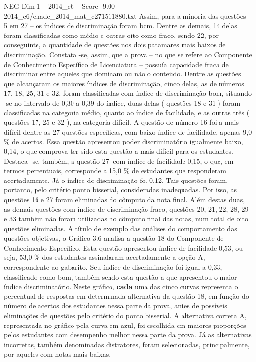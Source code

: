 \begin{textsample}{NEG Dim 1 – 2014\_c6 – Score -9.00 – 2014\_c6/enade\_2014\_mat\_c271511880.txt}
Assim, para a minoria das questões – 5 em 27 – os índices de discriminação foram bom.
Dentre as demais, 14 delas foram classificadas como médio e outras oito como fraco, sendo 22, por conseguinte, a quantidade de questões nos dois patamares mais baixos de discriminação.
Constata -se, assim, que a prova – no que se refere ao Componente de Conhecimento Específico de Licenciatura – possuía capacidade fraca de discriminar entre aqueles que dominam ou não o conteúdo.
Dentre as questões que alcançaram os maiores índices de discriminação, cinco delas, as de números 17, 18, 25, 31 e 32, foram classificadas com índice de discriminação bom, situando -se no intervalo de 0,30 a 0,39 do índice, duas delas ( questões 18 e 31 ) foram classificadas na categoria médio, quanto ao índice de facilidade, e as outras três ( questões 17, 25 e 32 ), na categoria difícil.
A questão de número 16 foi a mais difícil dentre as 27 questões específicas, com baixo índice de facilidade, apenas 9,0 \% de acertos.
Essa questão apresentou poder discriminatório igualmente baixo, 0,14, o que comprova ter sido esta questão a mais difícil para os estudantes.
Destaca -se, também, a questão 27, com índice de facilidade 0,15, o que, em termos percentuais, corresponde a 15,0 \% de estudantes que responderam acertadamente.
Já o índice de discriminação foi 0,12.
Tais questões foram, portanto, pelo critério ponto bisserial, consideradas inadequadas.
Por isso, as questões 16 e 27 foram eliminadas do cômputo da nota final.
Além destas duas, as demais questões com índice de discriminação fraco, questões 20, 21, 22, 28, 29 e 33 também não foram utilizadas no cômputo final das notas, num total de oito questões eliminadas.
A título de exemplo das análises do comportamento das questões objetivas, o Gráfico 3.6 analisa a questão 18 do Componente de Conhecimento Específico.
Esta questão apresentou índice de facilidade 0,53, ou seja, 53,0 \% dos estudantes assinalaram acertadamente a opção A, correspondente ao gabarito.
Seu índice de discriminação foi igual a 0,33, classificado como bom, também sendo esta questão a que apresentou o maior índice discriminatório.
Neste gráfico, \textbf{cada} uma das cinco curvas representa o percentual de respostas em determinada alternativa da questão 18, em função do número de acertos dos estudantes nessa parte da prova, antes de possíveis eliminações de questões pelo critério do ponto bisserial.
A alternativa correta A, representada no gráfico pela curva em azul, foi escolhida em maiores proporções pelos estudantes com desempenho melhor nessa parte da prova.
Já as alternativas incorretas, também denominadas distratores, foram selecionadas, principalmente, por aqueles com notas mais baixas.

\end{textsample}
